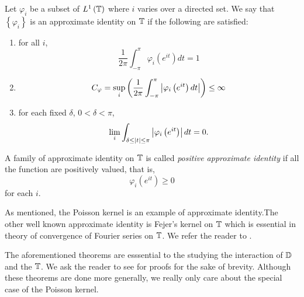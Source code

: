 \begin{definition}
    Let $\varphi_{i}$ be a subset of $L^{1} \left( \mathbb T \right)$ where $i$ varies over a directed set. We say that $\left\{ \varphi_{i} \right\}$ is an approximate identity on $\mathbb T$ if the following are satisfied:
    \begin{enumerate}
	\item for all $i$,
	    \begin{equation*}
		\frac{1}{2\pi} \int_{-\pi}^{\pi} \varphi_{i} \left( e^{it} \right) dt =1
	    \end{equation*}
	\item
	    \begin{equation*}
		C_{\varphi} = \sup_{i} \left( \frac{1}{2\pi} \int_{-\pi}^{\pi} \left\lvert \varphi_{i} \left( e^{it} \right)dt \right\rvert \right) \le \infty
	    \end{equation*}
	\item for each fixed $\delta$, $0<\delta<\pi$, 
	    \begin{equation*}
		\lim_{i} \int_{\delta \le \left\lvert t \right\rvert \le \pi} \left\lvert \varphi_{i} \left( e^{it} \right) \right\rvert dt = 0.
	    \end{equation*}
    \end{enumerate}
    A family of approximate identity on $\mathbb T$ is called \textit{positive approximate identity} if all the function are positively valued, that is, 
    \begin{equation*}
	\varphi_{i}\left( e^{it} \right) \ge 0
    \end{equation*}
    for each $i$.
\end{definition}
As mentioned, the Poisson kernel is an example of approximate identity.The other well known approximate identity is Fejer's kernel on $\mathbb T$ which is essential in theory of convergence of Fourier series on $\mathbb T$. We refer the reader to \cite{katznelson2004introduction}.


The aforementioned theorems are esssential to the studying the interaction of $\mathbb D$ and the $\mathbb T$. We ask the reader to see \cite{mashreghi2009representation} for proofs for the sake of brevity. Although these theorems are done more generally, we really only care about the special case of the Poisson kernel.

